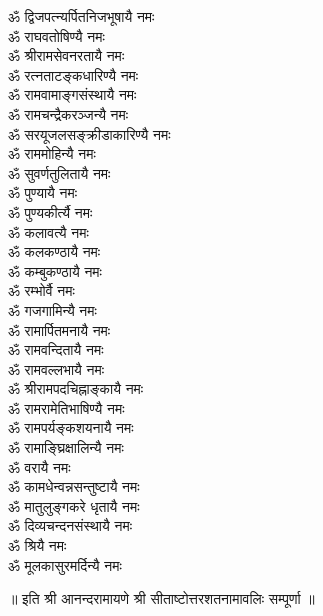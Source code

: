 \begin{multicols}{2}
\begin{flushleft}
ॐ द्विजपत्न्यर्पितनिजभूषायै नमः\\
ॐ राघवतोषिण्यै नमः\\
ॐ श्रीरामसेवनरतायै नमः\\
ॐ रत्नताटङ्कधारिण्यै नमः\\
ॐ रामवामाङ्गसंस्थायै नमः\\
ॐ रामचन्द्रैकरञ्जन्यै नमः\\
ॐ सरयूजलसङ्क्रीडाकारिण्यै नमः\\
ॐ राममोहिन्यै नमः\hfill{}\\
ॐ सुवर्णतुलितायै नमः\\
ॐ पुण्यायै नमः\\
ॐ पुण्यकीर्त्यै नमः\\
ॐ कलावत्यै नमः\\
ॐ कलकण्ठायै नमः\\
ॐ कम्बुकण्ठायै नमः\\
ॐ रम्भोर्वै नमः\\
ॐ गजगामिन्यै नमः\\
ॐ रामार्पितमनायै नमः\\
ॐ रामवन्दितायै नमः\hfill{}\\
ॐ रामवल्लभायै नमः\\
ॐ श्रीरामपदचिह्नाङ्कायै नमः\\
ॐ रामरामेतिभाषिण्यै नमः\\
ॐ रामपर्यङ्कशयनायै नमः\\
ॐ रामाङ्घ्रिक्षालिन्यै नमः\\
ॐ वरायै नमः\\
ॐ कामधेन्वन्नसन्तुष्टायै नमः\\
ॐ मातुलुङ्गकरे धृतायै नमः\\
ॐ दिव्यचन्दनसंस्थायै नमः\\
ॐ श्रियै नमः\hfill{}\\
ॐ मूलकासुरमर्दिन्यै नमः\\
\end{flushleft}
\end{multicols}
\centerline{॥ इति श्री आनन्दरामायणे श्री सीताष्टोत्तरशतनामावलिः सम्पूर्णा ॥}
